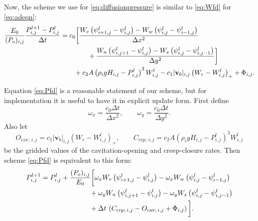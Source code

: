 \documentclass[11pt,final]{amsart}%
\newcommand\bv{\mathbf{v}}
\newcommand{\Wlij}{W^l_{i,j}}
\newcommand{\Plij}{P^l_{i,j}}
\begin{document}
Now, the scheme we use for \eqref{eq:diffusionpressure} is similar to \eqref{eq:Wfd} for \eqref{eq:adeqn}:
\begin{align}
\frac{E_0}{(P_o)_{i,j}} \frac{P_{i,j}^{l+1} - \Plij}{\Delta t} &= c_0 \bigg[\frac{W_e \left(\psi_{i+1,j}^l - \psi_{i,j}^l\right) - W_w \left(\psi_{i,j}^l - \psi_{i-1,j}^l\right)}{\Delta x^2}  \label{eq:Pfd} \\
      &\qquad\qquad + \frac{W_n \left(\psi_{i,j+1}^l - \psi_{i,j}^l\right) - W_s \left(\psi_{i,j}^l - \psi_{i,j-1}^l\right)}{\Delta y^2}\bigg] \notag \\
      &\qquad + c_2 A \left(\rho_i g H_{i,j}- \Plij\right)^3 \Wlij - c_1 |\bv_b|_{i,j} \left(W_r - \Wlij\right)_+ + \Phi_{i,j}. \notag
\end{align}

Equation \eqref{eq:Pfd} is a reasonable statement of our scheme, but for implementation it is useful to have it in explicit update form.  First define
	$$\omega_x = \frac{c_0 \Delta t}{\Delta x^2}, \qquad \omega_y = \frac{c_0 \Delta t}{\Delta y^2}.$$
Also let
\newcommand{\Ocavij}{O_{\text{cav};\, i,j}}
\newcommand{\Ccrpij}{C_{\text{crp};\, i,j}}
	$$\Ocavij = c_1 |\bv_b|_{i,j} \left(W_r - \Wlij\right)_+, \qquad \Ccrpij = c_2 A \left(\rho_i g H_{i,j} - \Plij\right)^3 \Wlij$$
be the gridded values of the cavitation-opening and creep-closure rates.  Then scheme \eqref{eq:Pfd} is equivalent to this form:
\begin{align}
P_{i,j}^{l+1} &= \Plij +  \frac{(P_o)_{i,j}}{E_0} \bigg[\omega_x W_e \left(\psi_{i+1,j}^l - \psi_{i,j}^l\right) - \omega_x W_w \left(\psi_{i,j}^l - \psi_{i-1,j}^l\right) \label{eq:Pfdupdate} \\
      &\qquad\qquad\qquad\quad + \omega_y W_n \left(\psi_{i,j+1}^l - \psi_{i,j}^l\right) - \omega_y W_s \left(\psi_{i,j}^l - \psi_{i,j-1}^l\right) \notag \\
      &\qquad\qquad\qquad\quad + \Delta t\, \left(\Ccrpij - \Ocavij + \Phi_{i,j}\right)\bigg]. \notag
\end{align}
\end{document}

